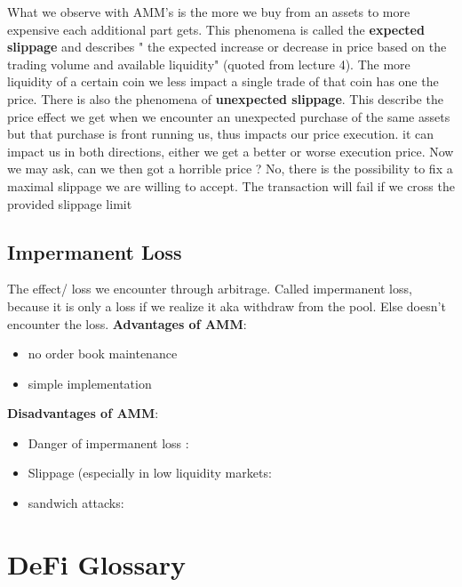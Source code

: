 \documentclass{article}
\begin{document}
What we observe with AMM's is the more we buy from an assets to more expensive each additional part gets. This phenomena is called the \textbf{expected slippage} and describes " the expected increase or decrease in price based on the trading volume and available liquidity" (quoted from lecture 4). The more liquidity of a certain coin we less impact a single trade of that coin has one the price. There is also the phenomena of \textbf{unexpected slippage}. This describe the price effect we get when we encounter an unexpected purchase of the same assets but that purchase is front running us, thus impacts our price execution. it can impact us in both directions, either we get a better or worse execution price. Now we may ask, can we then got a horrible price ? No, there is the possibility to fix a maximal slippage we are willing to accept. The transaction will fail if we cross the provided slippage limit

\subsection{Impermanent Loss} 
The effect/ loss we encounter through arbitrage. Called impermanent loss, because it is only a loss if we realize it aka withdraw from the pool. Else doesn't encounter the loss.
\textbf{Advantages of AMM}:
\begin{itemize}
    \item {no order book maintenance}
    \item {simple implementation}

\end{itemize}
\textbf{Disadvantages of AMM}:
\begin{itemize}
    \item {Danger of impermanent loss }: 
    \item {Slippage (especially in low liquidity markets}: 
    \item {sandwich attacks}:  
\end{itemize}






\section{DeFi Glossary}
\end{document}
